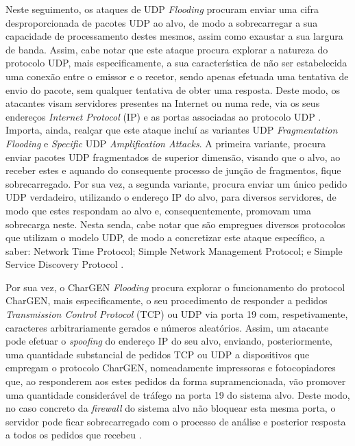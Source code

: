 Neste seguimento, os ataques de UDP \textit{Flooding} procuram enviar uma cifra desproporcionada de pacotes UDP ao alvo, de modo a sobrecarregar a sua capacidade de processamento destes mesmos, assim como exaustar a sua largura de banda. Assim, cabe notar que este ataque procura explorar a natureza do protocolo UDP, mais especificamente, a sua característica de não ser estabelecida uma conexão entre o emissor e o recetor, sendo apenas efetuada uma tentativa de envio do pacote, sem qualquer tentativa de obter uma resposta. Deste modo, os atacantes visam servidores presentes na Internet ou numa rede, via os seus endereços \textit{Internet Protocol} (IP) e as portas associadas ao protocolo UDP \cite{esecurityplanet_types_of_ddos_attacks}. Importa, ainda, realçar que este ataque incluí as variantes UDP \textit{Fragmentation Flooding} e \textit{Specific} UDP \textit{Amplification Attacks}. A primeira variante, procura enviar pacotes UDP fragmentados de superior dimensão, visando que o alvo, ao receber estes e aquando do consequente processo de junção de fragmentos, fique sobrecarregado. Por sua vez, a segunda variante, procura enviar um único pedido UDP verdadeiro, utilizando o endereço IP do alvo, para diversos servidores, de modo que estes respondam ao alvo e, consequentemente, promovam uma sobrecarga neste. Nesta senda, cabe notar que são empregues diversos protocolos que utilizam o modelo UDP, de modo a concretizar este ataque específico, a saber: Network Time Protocol; Simple Network Management Protocol; e Simple Service Discovery Protocol \cite{esecurityplanet_types_of_ddos_attacks}.

Por sua vez, o CharGEN \textit{Flooding} procura explorar o funcionamento do protocol CharGEN, mais especificamente, o seu procedimento de responder a pedidos \textit{Transmission Control Protocol} (TCP) ou UDP via porta 19 com, respetivamente, caracteres arbitrariamente gerados e números aleatórios. Assim, um atacante pode efetuar o \textit{spoofing} do endereço IP do seu alvo, enviando, posteriormente, uma quantidade substancial de pedidos TCP ou UDP a dispositivos que empregam o protocolo CharGEN, nomeadamente impressoras e fotocopiadores que, ao responderem aos estes pedidos da forma supramencionada, vão promover uma quantidade considerável de tráfego na porta 19 do sistema alvo. Deste modo, no caso concreto da \textit{firewall} do sistema alvo não bloquear esta mesma porta, o servidor pode ficar sobrecarregado com o processo de análise e posterior resposta a todos os pedidos que recebeu \cite{esecurityplanet_types_of_ddos_attacks,connectwise_types_of_ddos_attacks}.

